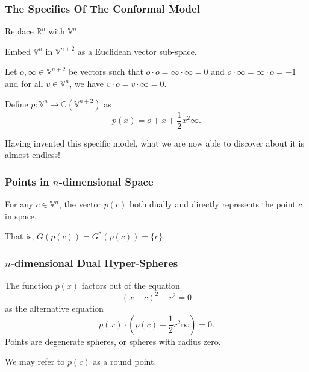 \documentclass{beamer}
\newcommand{\G}{\mathbb{G}}
\newcommand{\V}{\mathbb{V}}
\newcommand{\R}{\mathbb{R}}
\newcommand{\nvao}{o}
\newcommand{\nvai}{\infty}
\begin{document}
\begin{frame}
\frametitle{The Specifics Of The Conformal Model}
Replace $\R^n$ with $\V^n$.

Embed $\V^n$ in $\V^{n+2}$ as a Euclidean vector sub-space.

Let $\nvao,\nvai\in\V^{n+2}$ be vectors such that $\nvao\cdot\nvao=\nvai\cdot\nvai=0$
and $\nvao\cdot\nvai=\nvai\cdot\nvao=-1$ and for all $v\in\V^n$, we have $v\cdot\nvao=v\cdot\nvai=0$.

\begin{definition}
Define $p:\V^n\to\G(\V^{n+2})$ as
\begin{equation*}
p(x) = \nvao + x + \frac{1}{2}x^2\nvai.
\end{equation*}
\end{definition}
Having \alert{invented} this specific model, what we are now able to \alert{discover} about it is almost endless!
\end{frame}

\begin{frame}
\frametitle{Points in $n$-dimensional Space}
For any $c\in\V^n$, the vector $p(c)$ both \alert{dually} and \alert{directly} represents the point $c$ in space.

That is, $G(p(c)) = G^*(p(c)) = \{c\}$.
\end{frame}

\begin{frame}
\frametitle{$n$-dimensional \alert{Dual} Hyper-Spheres}
The function $p(x)$ factors out of the equation
\begin{equation*}
(x-c)^2 - r^2 = 0
\end{equation*}
as the alternative equation
\begin{equation*}
p(x)\cdot\left(p(c) - \frac{1}{2}r^2\nvai\right) = 0.
\end{equation*}
Points are degenerate spheres, or spheres with radius zero.

We may refer to $p(c)$ as a \alert{round} point.
\end{frame}
\end{document}
